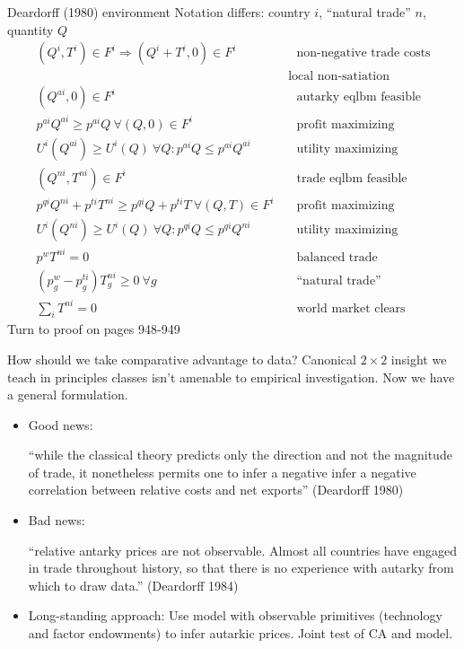 \documentclass[11pt,notes=hide,aspectratio=169]{beamer}
\begin{document}
\begin{frame}{Deardorff (1980) environment}
Notation differs: country $i$, ``natural trade'' $n$, quantity $Q$
{\small
\begin{align}
(Q^i,T^i) \in F^i \Rightarrow (Q^i+T^i,0) \in F^i &\quad \text{non-negative trade costs}\\
&\text{ local non-satiation } \\
(Q^{ai},0) \in F^i &\quad \text{autarky eqlbm feasible} \\
p^{ai} Q^{ai} \geq p^{ai} Q \ \forall (Q,0) \in F^i &\quad \text{profit maximizing} \\
U^i(Q^{ai}) \geq U^i(Q) \ \forall Q: p^{ai} Q \leq p^{ai} Q^{ai} &\quad \text{utility maximizing} \\
(Q^{ni},T^{ni}) \in F^i &\quad \text{trade eqlbm feasible} \\
p^{qi} Q^{ni} +p^{ti}T^{ni} \geq p^{qi} Q +p^{ti}T \ \forall (Q,T) \in F^i &\quad \text{profit maximizing} \\
U^i(Q^{ni}) \geq U^i(Q) \ \forall Q: p^{qi} Q \leq p^{qi} Q^{ni} &\quad \text{utility maximizing} \\
p^w T^{ni} = 0  &\quad \text{balanced trade} \\
(p^w_g - p^{ti}_g) T_g^{ni} \geq 0 \ \forall g &\quad \text{``natural trade''} \\
\sum_i T^{ni} = 0 &\quad \text{world market clears}
\end{align}
{\footnotesize Turn to proof on pages 948-949}
}
\end{frame}
\begin{frame}{How should we take comparative advantage to data?}
Canonical $2\times2$ insight we teach in principles classes isn't amenable to empirical investigation.
Now we have a general formulation.
\begin{itemize}
	\item Good news: {``while the classical theory predicts only the direction and not the magnitude of trade, it nonetheless permits one to infer a negative infer a negative correlation between relative costs and net exports'' (Deardorff 1980) \par}
	\item Bad news: {``relative antarky prices are not observable. Almost all countries have engaged in trade throughout history, so that there is no experience with autarky from which to draw data.'' (Deardorff 1984) \par}
	\item Long-standing approach: Use model with observable primitives (technology and factor endowments) to infer autarkic prices. Joint test of CA and model.
\end{itemize}
\end{frame}
\end{document}
